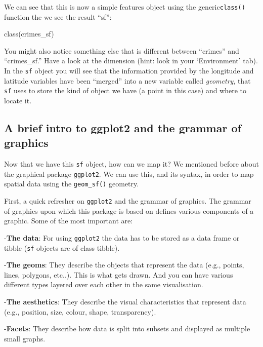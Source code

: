 \documentclass[
]{book}
\newenvironment{Shaded}{\begin{snugshade}}{\end{snugshade}}
\newcommand{\FunctionTok}[1]{\textcolor[rgb]{0.00,0.00,0.00}{#1}}
\newcommand{\NormalTok}[1]{#1}
\begin{document}
We can see that this is now a simple features object using the generic\texttt{class()} function the we see the result ``sf'':

\begin{Shaded}
\begin{Highlighting}[]
\FunctionTok{class}\NormalTok{(crimes\_sf)}
\end{Highlighting}
\end{Shaded}

You might also notice something else that is different between ``crimes'' and ``crimes\_sf.'' Have a look at the dimension (hint: look in your `Environment' tab). In the \texttt{sf} object you will see that the information provided by the longitude and latitude variables have been ``merged'' into a new variable called \emph{geometry}, that \texttt{sf} uses to store the kind of object we have (a point in this case) and where to locate it.

\hypertarget{a-brief-intro-to-ggplot2-and-the-grammar-of-graphics}{%
\subsection{A brief intro to ggplot2 and the grammar of graphics}\label{a-brief-intro-to-ggplot2-and-the-grammar-of-graphics}}

Now that we have this \texttt{sf} object, how can we map it? We mentioned before about the graphical package \texttt{ggplot2}. We can use this, and its syntax, in order to map spatial data using the \texttt{geom\_sf()} geometry.

First, a quick refresher on \texttt{ggplot2} and the grammar of graphics. The grammar of graphics upon which this package is based on defines various components of a graphic. Some of the most important are:

-\textbf{The data}: For using \texttt{ggplot2} the data has to be stored as a data frame or tibble (\texttt{sf} objects are of class tibble).

-\textbf{The geoms}: They describe the objects that represent the data (e.g., points, lines, polygons, etc..). This is what gets drawn. And you can have various different types layered over each other in the same visualisation.

-\textbf{The aesthetics}: They describe the visual characteristics that represent data (e.g., position, size, colour, shape, transparency).

-\textbf{Facets}: They describe how data is split into subsets and displayed as multiple small graphs.
\end{document}
